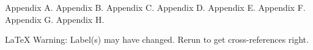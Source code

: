 Appendix A.
Appendix B.
Appendix C.
Appendix D.
Appendix E.
Appendix F.
Appendix G.
Appendix H.

LaTeX Warning: Label(s) may have changed. Rerun to get cross-references right.

